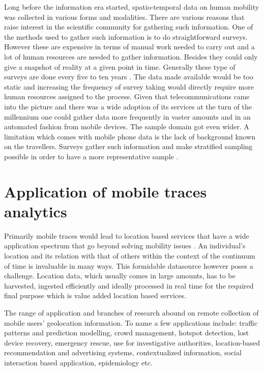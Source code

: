 \documentclass[12pt, a4paper]{report}
\theoremstyle{definition}
\theoremstyle{definition}%
\theoremstyle{definition}%
\theoremstyle{definition}%
\theoremstyle{definition}%
\theoremstyle{definition}%
\begin{document}
Long before the information era started, spatio-temporal data on human mobility was collected in various forms and modalities. There are various reasons that raise interest in the scientific community for gathering such information. One of the methods used to gather such information is to do straightforward surveys\cite{Calabrese2013,Colak2015}. However these are expensive in terms of manual work needed to carry out and a lot of human resources are needed to gather information. Besides they could only give a snapshot of reality at a given point in time.  Generally these type of surveys are done every five to ten years \cite{Toole2015}. The data made available would be too static and increasing the frequency of survey taking would directly require more human resources assigned to the process. Given that telecommunications came into the picture and there was a wide adoption of its services at the turn of the millennium one could gather data more frequently in vaster amounts and in an automated fashion from mobile devices. The sample domain got even wider. A limitation which comes with mobile phone data is the lack of background known on the travellers. Surveys gather such information and make stratified sampling possible in order to have a more representative sample \cite{Colak2015}.

\section{Application of mobile traces analytics} \label{section:introduction:application_mobile_traces}

Primarily mobile traces would lead to location based services that have a wide application spectrum that go beyond solving mobility issues \cite{Hoteit2014,Calabrese2013,Gonzalez2008,Hoteit2016}. An individual's location and its relation with that of others within the context of the continuum of time is invaluable in many ways. This formidable datasource however poses a challenge. Location data, which usually comes in large amounts, has to be harvested, ingested efficiently and ideally processed in real time for the required final purpose which is value added location based services.

The range of application and branches of research abound on remote collection of mobile users' geolocation information.   To name a few applications include: traffic patterns and prediction modelling, crowd management, hotspot detection, lost device recovery, emergency rescue, use for investigative authorities,  location-based recommendation and advertising systems, contextualized information, social interaction based application, epidemiology etc.  
\end{document}
